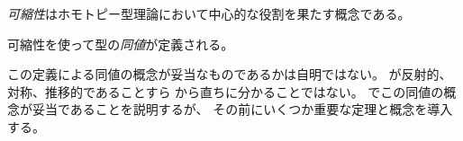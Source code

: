 \documentclass[index]{subfiles}
\begin{document}

\emph{可縮性}はホモトピー型理論において中心的な役割を果たす概念である。








可縮性を使って型の\emph{同値}が定義される。





この定義による同値の概念が妥当なものであるかは自明ではない。
\myInlineMath{\myEquiv}が反射的、対称、推移的であることすら
から直ちに分かることではない。
でこの同値の概念が妥当であることを説明するが、
その前にいくつか重要な定理と概念を導入する。
\end{document}
